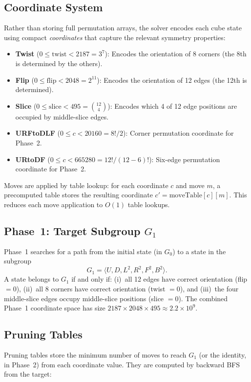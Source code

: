 \documentclass[conference]{IEEEtran}
\begin{document}
\subsection{Coordinate System}
\label{sec:coordinates}
Rather than storing full permutation arrays, the solver encodes each cube state using compact \emph{coordinates} that capture the relevant symmetry properties:

\begin{itemize}[leftmargin=*]
  \item \textbf{Twist} ($0 \leq \text{twist} < 2187 = 3^7$): Encodes the orientation of 8 corners (the 8th is determined by the others).
  \item \textbf{Flip} ($0 \leq \text{flip} < 2048 = 2^{11}$): Encodes the orientation of 12 edges (the 12th is determined).
  \item \textbf{Slice} ($0 \leq \text{slice} < 495 = \binom{12}{4}$): Encodes which 4 of 12 edge positions are occupied by middle-slice edges.
  \item \textbf{URFtoDLF} ($0 \leq c < 20160 = 8!/2$): Corner permutation coordinate for Phase~2.
  \item \textbf{URtoDF} ($0 \leq c < 665280 = 12!/(12{-}6)!$): Six-edge permutation coordinate for Phase~2.
\end{itemize}

Moves are applied by table lookup: for each coordinate $c$ and move $m$, a precomputed table stores the resulting coordinate $c' = \text{moveTable}[c][m]$. This reduces each move application to $O(1)$ table lookups.

\subsection{Phase~1: Target Subgroup $G_1$}
Phase~1 searches for a path from the initial state (in $G_0$) to a state in the subgroup
\begin{equation}
G_1 = \langle U, D, L^2, R^2, F^2, B^2 \rangle.
\end{equation}
A state belongs to $G_1$ if and only if: (i)~all 12 edges have correct orientation (flip $= 0$), (ii)~all 8 corners have correct orientation (twist $= 0$), and (iii)~the four middle-slice edges occupy middle-slice positions (slice $= 0$). The combined Phase~1 coordinate space has size $2187 \times 2048 \times 495 \approx 2.2 \times 10^9$.

\subsection{Pruning Tables}
\label{sec:pruning}
Pruning tables store the minimum number of moves to reach $G_1$ (or the identity, in Phase~2) from each coordinate value. They are computed by backward BFS from the target:
\end{document}
